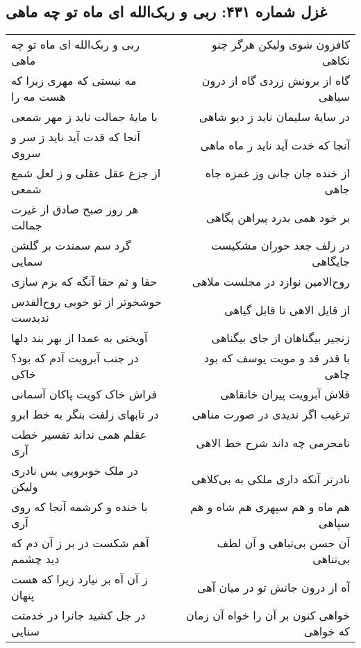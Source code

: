 \begin{center}
\section*{غزل شماره ۴۳۱: ربی و ربک‌الله ای ماه تو چه ماهی}
\label{sec:431}
\begin{longtable}{l p{0.5cm} r}
ربی و ربک‌الله ای ماه تو چه ماهی
&&
کافزون شوی ولیکن هرگز چنو نکاهی
\\
مه نیستی که مهری زیرا که هست مه را
&&
گاه از برونش زردی گاه از درون سیاهی
\\
با مایهٔ جمالت ناید ز مهر شمعی
&&
در سایهٔ سلیمان ناید ز دیو شاهی
\\
آنجا که قدت آید ناید ز سر و سروی
&&
آنجا که خدت آید ناید ز ماه ماهی
\\
از جزع عقل عقلی و ز لعل شمع شمعی
&&
از خنده جان جانی وز غمزه جاه جاهی
\\
هر روز صبح صادق از غیرت جمالت
&&
بر خود همی بدرد پیراهن پگاهی
\\
گرد سم سمندت بر گلشن سمایی
&&
در زلف جعد حوران مشکیست جایگاهی
\\
حقا و ثم حقا آنگه که بزم سازی
&&
روح‌الامین نوازد در مجلست ملاهی
\\
خوشخوتر از تو خویی روح‌القدس ندیدست
&&
از قایل الاهی تا قابل گیاهی
\\
آویختی به عمدا از بهر بند دلها
&&
زنجیر بیگناهان از جای بیگناهی
\\
در جنب آبرویت آدم که بود؟ خاکی
&&
با قدر قد و مویت یوسف که بود چاهی
\\
فراش خاک کویت پاکان آسمانی
&&
قلاش آبرویت پیران خانقاهی
\\
در تابهای زلفت بنگر به خط ابرو
&&
ترغیب اگر ندیدی در صورت مناهی
\\
عقلم همی نداند تفسیر خطت آری
&&
نامحرمی چه داند شرح خط الاهی
\\
در ملک خوبرویی بس نادری ولیکن
&&
نادرتر آنکه داری ملکی به بی‌کلاهی
\\
با خنده و کرشمه آنجا که روی آری
&&
هم ماه و هم سپهری هم شاه و هم سپاهی
\\
آهم شکست در بر ز آن دم که دید چشمم
&&
آن حسن بی‌تباهی و آن لطف بی‌تناهی
\\
ز آن آه بر نیارد زیرا که هست پنهان
&&
آه از درون جانش تو در میان آهی
\\
در جل کشید جانرا در خدمتت سنایی
&&
خواهی کنون بر آن را خواه آن زمان که خواهی
\\
\end{longtable}
\end{center}
